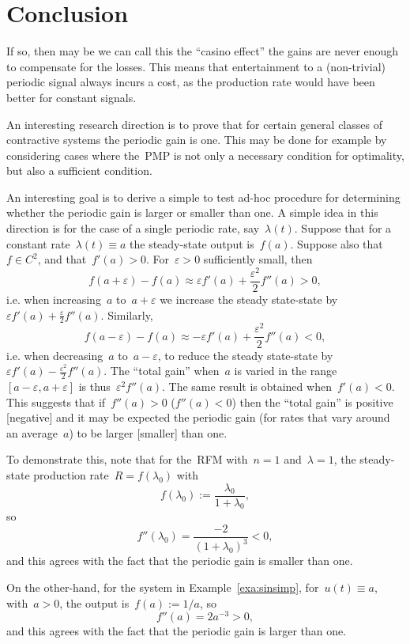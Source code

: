 \section{Conclusion}
If so, then may be we can call this the ``casino effect'' the gains are never enough to compensate for the losses.
This means that entertainment to a (non-trivial) periodic signal always incurs a cost, as the production rate would have been better for constant signals.


An interesting research direction is to prove that for certain general classes of contractive systems the periodic gain is one. 
This may be done for example by considering cases where the~PMP is not only a necessary condition for optimality, but also a sufficient condition. 

An interesting goal is to derive  a simple to test ad-hoc  procedure for determining whether the periodic gain is larger or smaller than one.  
A simple idea in this direction is for the case of a single periodic rate, say~$\lambda(t)$.
Suppose that for a constant rate~$\lambda(t)\equiv a$ the steady-state output is~$f(a)$. 
Suppose also that~$f\in C^2$, and that~$f'(a)> 0$. 
For~$\varepsilon>0$ sufficiently small, then
\begin{equation}
	f(a+\varepsilon)-f(a) \approx \varepsilon f'(a) +\frac{\varepsilon^2}{2} f''(a)   >0,
\end{equation}
i.e. when increasing~$a$ to~$a+\varepsilon$ we increase  the steady state-state  by~$\varepsilon f'(a) +\frac{\varepsilon}{2} f''(a)$. 
Similarly, 
\begin{equation}
f(a-\varepsilon)-f(a) \approx  -\varepsilon f'(a) +\frac{\varepsilon^2}{2} f''(a)   <0,
\end{equation}
i.e.  when decreasing~$a$ to~$a-\varepsilon$, to reduce the steady state-state by~$ \varepsilon f'(a)  - \frac{\varepsilon^2}{2} f''(a)$.
The ``total gain''  when~$a$ is varied in the range~$[a-\varepsilon,a+\varepsilon]$ is thus~$\varepsilon^2  f''(a)$.  
The same result is obtained when~$f'(a)<0$. 
This suggests that if~$f''(a)>0$ ($f''(a)<0$) then the ``total gain'' is positive [negative]  and it may be expected the periodic gain (for rates that vary around an average~$a$) to be larger [smaller] than one.

To demonstrate this, note that for the~RFM with~$n=1$ and~$\lambda=1$, the steady-state production rate~$R=f(\lambda_0)$  with
\begin{equation}
f(\lambda_0):=\frac{\lambda_0}{1+\lambda_0},
\end{equation}
so
\begin{equation}
f''(\lambda_0) =\frac{-2}{(1+\lambda_0)^3} <0,
\end{equation}
and this agrees with the fact that the periodic gain is smaller than one. 

On the other-hand, for the system in Example~\ref{exa:sinsimp}, for~$u(t)\equiv a$, with~$a> 0$, 
the output is~$f(a):=1/a $, so 
\begin{equation}
f''(a) = 2a^{-3}  > 0,
\end{equation}
and this agrees with the fact that the periodic gain is larger than one. 